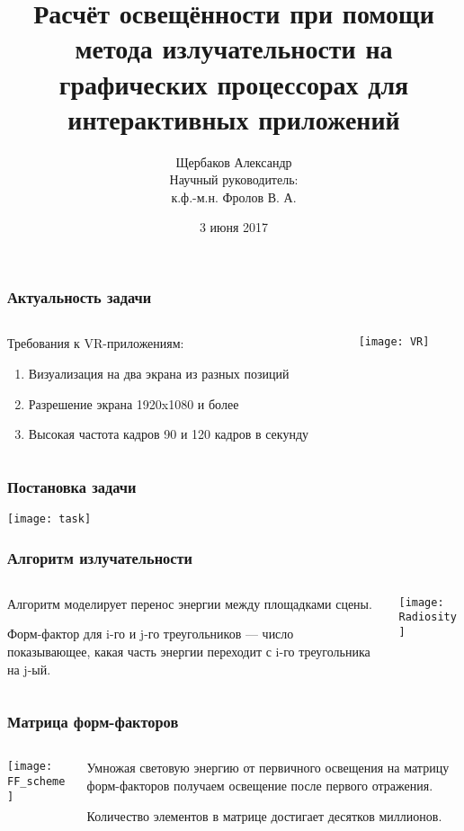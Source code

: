 \documentclass[unicode, dvipsnames]{beamer}
\title{Расчёт освещённости при помощи метода излучательности на графических процессорах для интерактивных приложений}
\author{\small Щербаков Александр \\ \vspace{10pt} Научный руководитель: \\ к.ф.-м.н. Фролов В. А.}
\date{\small 3 июня 2017}
\begin{document}
\frame[plain]{\titlepage}

\begin{frame}
	\frametitle{Актуальность задачи}
	\begin{columns}[T]
    	\begin{column}[T]{5cm}
			Требования к VR-приложениям:
    		
		    \begin{enumerate}
		    	\item Визуализация на два экрана из разных позиций
		    	\item Разрешение экрана 1920x1080 и более
		    	\item Высокая частота кадров 90 и 120 кадров в секунду
		    \end{enumerate}
	    \end{column}
    	\begin{column}[T]{5cm}
			\texttt{[image: VR]}
    	\end{column}
    \end{columns}
\end{frame}

\begin{frame}
	\frametitle{Постановка задачи}
	\texttt{[image: task]}
\end{frame}

\begin{frame}
	\frametitle{Алгоритм излучательности}
	\begin{columns}[T]
    	\begin{column}[T]{5cm}
			Алгоритм моделирует перенос энергии между площадками сцены.
			
			Форм-фактор для i-го и j-го треугольников --- число показывающее, какая часть энергии переходит с i-го треугольника на j-ый.
	    \end{column}
    	\begin{column}[T]{5cm}
			\texttt{[image: Radiosity]}
    	\end{column}
    \end{columns}
\end{frame}

\begin{frame}
	\frametitle{Матрица форм-факторов}
	\begin{columns}[T]
    	\begin{column}[T]{5cm}
			\texttt{[image: FF\_scheme]}
    	\end{column}
    	\begin{column}[T]{5cm}
			Умножая световую энергию от первичного освещения на матрицу форм-факторов получаем освещение после первого отражения.
			
			Количество элементов в матрице достигает десятков миллионов.
	    \end{column}
    \end{columns}
\end{frame}
\end{document}
